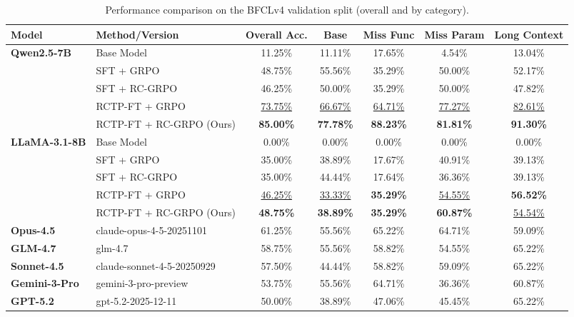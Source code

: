 \documentclass{article}
\theoremstyle{plain}
\theoremstyle{definition}
\theoremstyle{remark}
\begin{document}
\begin{table}[t]
\centering
\small
\setlength{\tabcolsep}{4pt}
\renewcommand{\arraystretch}{1.08}
\begin{tabular}{@{}llccccc@{}}
\toprule
\textbf{Model} & \textbf{Method/Version} & \textbf{Overall Acc.} & \textbf{Base} & \textbf{Miss Func} & \textbf{Miss Param} & \textbf{Long Context} \\
\midrule
\multirow{5}{*}{\cellcolor{white}\textbf{Qwen2.5-7B}} & Base Model & 11.25\% & 11.11\% & 17.65\% & 4.54\% & 13.04\% \\
& SFT + GRPO & 48.75\% & 55.56\% & 35.29\% & 50.00\% &  52.17\%\\
& SFT + RC-GRPO & 46.25\% & 50.00\% & 35.29\% & 50.00\% & 47.82\% \\
& RCTP-FT + GRPO & \underline{73.75\%} & \underline{66.67\%} & \underline{64.71\%} & \underline{77.27\%} & \underline{82.61\%} \\
\rowcolor{blue!10}
& RCTP-FT + RC-GRPO (Ours) & \textbf{85.00\%} & \textbf{77.78\%} & \textbf{88.23\%}  & \textbf{81.81\%} & \textbf{91.30\%} \\
\midrule
\multirow{5}{*}{\cellcolor{white}\textbf{LLaMA-3.1-8B}} & Base Model & 0.00\% & 0.00\% & 0.00\% & 0.00\% & 0.00\% \\
& SFT + GRPO & 35.00\% & 38.89\% & 17.67\% & 40.91\% & 39.13\% \\
& SFT + RC-GRPO & 35.00\% & 44.44\% & 17.64\% & 36.36\% & 39.13\% \\
& RCTP-FT + GRPO & \underline{46.25\%} & \underline{33.33\%} & \textbf{35.29\%} & \underline{54.55\%} & \textbf{56.52\%} \\
\rowcolor{blue!10}
& RCTP-FT + RC-GRPO (Ours) & \textbf{48.75\%} & \textbf{38.89\%} & \textbf{35.29\%} & \textbf{60.87\%} & \underline{54.54\%} \\
\midrule
\textbf{Opus-4.5} & {\footnotesize claude-opus-4-5-20251101} & 61.25\% & 55.56\% & 65.22\% & 64.71\% & 59.09\% \\
\midrule
\textbf{GLM-4.7} & {\footnotesize glm-4.7} & 58.75\% & 55.56\% & 58.82\% & 54.55\% & 65.22\% \\
\midrule
\textbf{Sonnet-4.5} & {\footnotesize claude-sonnet-4-5-20250929} & 57.50\% & 44.44\% & 58.82\% & 59.09\% & 65.22\% \\
\midrule
\textbf{Gemini-3-Pro} & {\footnotesize gemini-3-pro-preview} & 53.75\% & 55.56\% & 64.71\% & 36.36\% & 60.87\% \\
\midrule
\textbf{GPT-5.2} & {\footnotesize gpt-5.2-2025-12-11} & 50.00\% & 38.89\% & 47.06\% & 45.45\% & 65.22\% \\
\bottomrule
\end{tabular}
\caption{Performance comparison on the BFCLv4 validation split (overall and by category).}
\label{tab:main_results}
\end{table}
\end{document}
